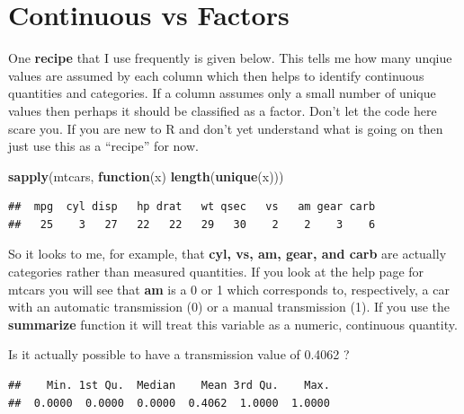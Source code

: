 \documentclass[]{book}
\newenvironment{Shaded}{\begin{snugshade}}{\end{snugshade}}
\newcommand{\KeywordTok}[1]{\textcolor[rgb]{0.13,0.29,0.53}{\textbf{#1}}}
\newcommand{\ControlFlowTok}[1]{\textcolor[rgb]{0.13,0.29,0.53}{\textbf{#1}}}
\newcommand{\OperatorTok}[1]{\textcolor[rgb]{0.81,0.36,0.00}{\textbf{#1}}}
\newcommand{\NormalTok}[1]{#1}
\begin{document}
\section{Continuous vs Factors}\label{continuous-vs-factors}

One \textbf{recipe} that I use frequently is given below. This tells me
how many unqiue values are assumed by each column which then helps to
identify continuous quantities and categories. If a column assumes only
a small number of unique values then perhaps it should be classified as
a factor. Don't let the code here scare you. If you are new to R and
don't yet understand what is going on then just use this as a ``recipe''
for now.

\begin{Shaded}
\begin{Highlighting}[]
\KeywordTok{sapply}\NormalTok{(mtcars, }\ControlFlowTok{function}\NormalTok{(x) }\KeywordTok{length}\NormalTok{(}\KeywordTok{unique}\NormalTok{(x)))}
\end{Highlighting}
\end{Shaded}

\begin{verbatim}
##  mpg  cyl disp   hp drat   wt qsec   vs   am gear carb 
##   25    3   27   22   22   29   30    2    2    3    6
\end{verbatim}

So it looks to me, for example, that \textbf{cyl, vs, am, gear, and
carb} are actually categories rather than measured quantities. If you
look at the help page for mtcars you will see that \textbf{am} is a 0 or
1 which corresponds to, respectively, a car with an automatic
transmission (0) or a manual transmission (1). If you use the
\textbf{summarize} function it will treat this variable as a numeric,
continuous quantity.

Is it actually possible to have a transmission value of 0.4062 ?

\begin{Shaded}
\end{Shaded}

\begin{verbatim}
##    Min. 1st Qu.  Median    Mean 3rd Qu.    Max. 
##  0.0000  0.0000  0.0000  0.4062  1.0000  1.0000
\end{verbatim}
\end{document}
